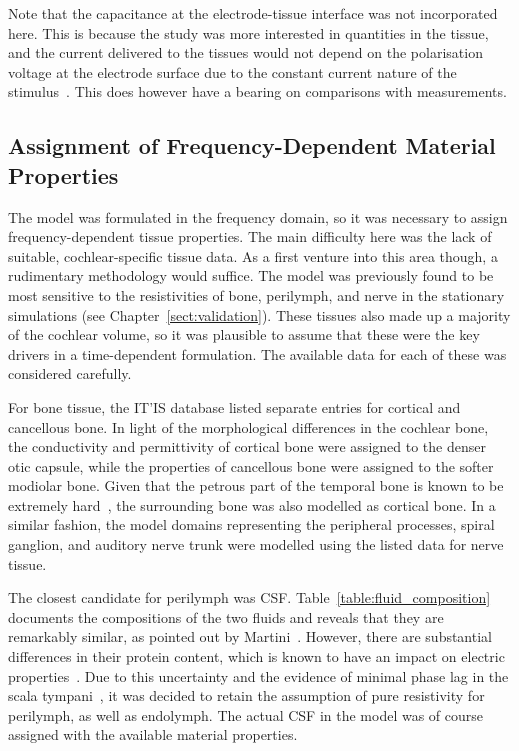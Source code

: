 Note that the capacitance at the electrode-tissue interface was not incorporated
here. This is because the study was more interested in quantities in the tissue,
and the current delivered to the tissues would not depend on the polarisation
voltage at the electrode surface due to the constant current nature of the
stimulus~\cite{grimnes2000}. This does however have a bearing on comparisons
with \invivo{} measurements.

\subsection{Assignment of Frequency-Dependent Material Properties}

The model was formulated in the frequency domain, so it was necessary to assign
frequency-dependent tissue properties. The main difficulty here was the lack of
suitable, cochlear-specific tissue data. As a first venture into this area
though, a rudimentary methodology would suffice. The model was previously found
to be most sensitive to the resistivities of bone, perilymph, and nerve in the
stationary simulations (see Chapter~\ref{sect:validation}). These tissues also
made up a majority of the cochlear volume, so it was plausible to assume that
these were the key drivers in a time-dependent formulation. The available data
for each of these was considered carefully.

For bone tissue, the IT'IS database listed separate entries for cortical and
cancellous bone. In light of the morphological differences in the cochlear bone,
the conductivity and permittivity of cortical bone were assigned to the denser
otic capsule, while the properties of cancellous bone were assigned to the
softer modiolar bone. Given that the petrous part of the temporal bone is known
to be extremely hard~\cite{bast1949,cooper1975}, the surrounding bone was also
modelled as cortical bone. In a similar fashion, the model domains representing
the peripheral processes, spiral ganglion, and auditory nerve trunk were
modelled using the listed data for nerve tissue.

The closest candidate for perilymph was CSF. Table~\ref{table:fluid_composition}
documents the compositions of the two fluids and reveals that they are
remarkably similar, as pointed out by Martini~\cite{martini2006}. However, there
are substantial differences in their protein content, which is known to have an
impact on electric properties~\cite{grimnes2000}. Due to this uncertainty and
the evidence of minimal phase lag in the scala tympani~\cite{spelman1982}, it
was decided to retain the assumption of pure resistivity for perilymph, as well
as endolymph.
The actual CSF in the model was of course assigned with the available
material properties.

